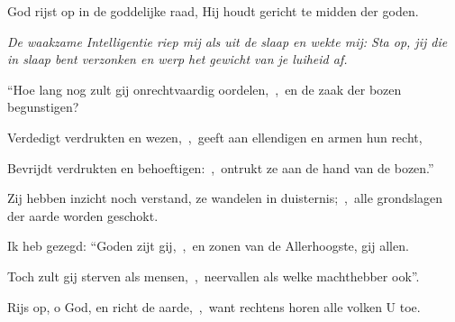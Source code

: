 \documentclass[12pt,twoside,a5paper]{article}
\begin{document}





\begin{halfparskip}
  God rijst op in de goddelijke raad, Hij houdt gericht te midden der goden.


   \emph{ De waakzame Intelligentie riep mij als uit de slaap en wekte mij: Sta op, jij die in slaap bent verzonken en werp het gewicht van je luiheid af.}

  ``Hoe lang nog zult gij onrechtvaardig oordelen,~\sep\ en de zaak der bozen begunstigen?

  Verdedigt verdrukten en wezen,~\sep\ geeft aan ellendigen en armen hun recht,

  Bevrijdt verdrukten en behoeftigen:~\sep\ ontrukt ze aan de hand van de bozen.''

  Zij hebben inzicht noch verstand, ze wandelen in duisternis;~\sep\ alle grondslagen der aarde worden geschokt.

  Ik heb gezegd: ``Goden zijt gij,~\sep\ en zonen van de Allerhoogste, gij allen.

  Toch zult gij sterven als mensen,~\sep\ neervallen als welke machthebber ook''.

  Rijs op, o God, en richt de aarde,~\sep\ want rechtens horen alle volken U toe.
\end{halfparskip}


\end{document}
